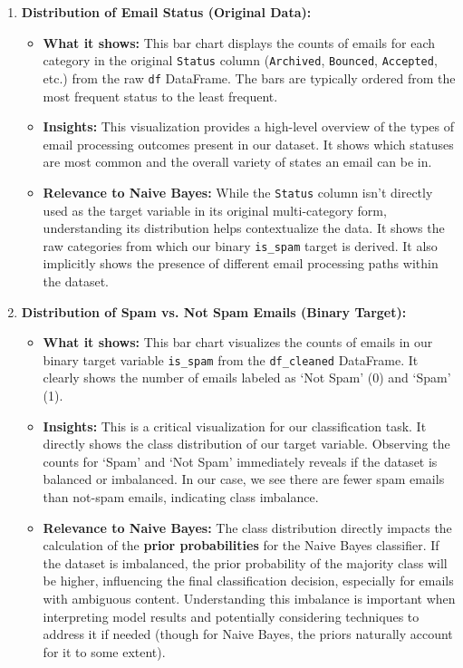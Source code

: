 \documentclass[12pt,letterpaper]{article}
\begin{document}
\begin{enumerate}
    \item \textbf{Distribution of Email Status (Original Data):}
    \begin{itemize}
        \item \textbf{What it shows:} This bar chart displays the counts of emails for each category in the original \texttt{Status} column (\texttt{Archived}, \texttt{Bounced}, \texttt{Accepted}, etc.) from the raw \texttt{df} DataFrame. The bars are typically ordered from the most frequent status to the least frequent.
        
        \item \textbf{Insights:} This visualization provides a high-level overview of the types of email processing outcomes present in our dataset. It shows which statuses are most common and the overall variety of states an email can be in.
        
        \item \textbf{Relevance to Naive Bayes:} While the \texttt{Status} column isn't directly used as the target variable in its original multi-category form, understanding its distribution helps contextualize the data. It shows the raw categories from which our binary \texttt{is\_spam} target is derived. It also implicitly shows the presence of different email processing paths within the dataset.
    \end{itemize}

    \item \textbf{Distribution of Spam vs. Not Spam Emails (Binary Target):}
    \begin{itemize}
        \item \textbf{What it shows:} This bar chart visualizes the counts of emails in our binary target variable \texttt{is\_spam} from the \texttt{df\_cleaned} DataFrame. It clearly shows the number of emails labeled as `Not Spam' (0) and `Spam' (1).
        
        \item \textbf{Insights:} This is a critical visualization for our classification task. It directly shows the class distribution of our target variable. Observing the counts for `Spam' and `Not Spam' immediately reveals if the dataset is balanced or imbalanced. In our case, we see there are fewer spam emails than not-spam emails, indicating class imbalance.
        
        \item \textbf{Relevance to Naive Bayes:} The class distribution directly impacts the calculation of the \textbf{prior probabilities} for the Naive Bayes classifier. If the dataset is imbalanced, the prior probability of the majority class will be higher, influencing the final classification decision, especially for emails with ambiguous content. Understanding this imbalance is important when interpreting model results and potentially considering techniques to address it if needed (though for Naive Bayes, the priors naturally account for it to some extent).
    \end{itemize}


\end{enumerate}
\end{document}
